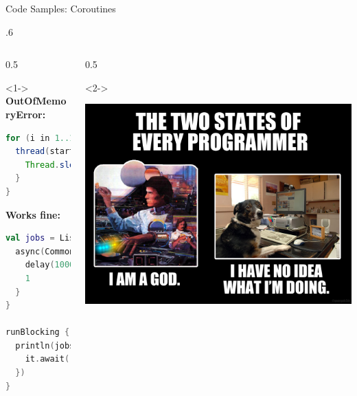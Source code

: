 \begin{frame}[fragile]{Code Samples: Coroutines}
	\begin{overlayarea}{\textwidth}{.6\textheight}
		\begin{columns}
			\begin{column}{0.5\textwidth}
				\begin{onlyenv}<1->
\textbf{OutOfMemoryError:}
\begin{lstlisting}[language=java,basicstyle=\ttfamily\tiny]
for (i in 1..100_000) {
  thread(start = true) {
    Thread.sleep(1000)
  }
}
\end{lstlisting}
\textbf{Works fine:}
\begin{lstlisting}[language=Kotlin,basicstyle=\ttfamily\tiny]
val jobs = List(100_000) {
  async(CommonPool) {
    delay(1000L)
    1
  }
}

runBlocking { // bridge async world
  println(jobs.sumBy {
    it.await()
  })
}
\end{lstlisting}
				\end{onlyenv}
			\end{column}
			\begin{column}{0.5\textwidth}
				\begin{onlyenv}<2->
					\begin{center}
						\includegraphics[width=\textwidth]{figures/twoStatesEveryProgrammer}
					\end{center}
				\end{onlyenv}
			\end{column}
		\end{columns}
	\end{overlayarea}
\end{frame}

